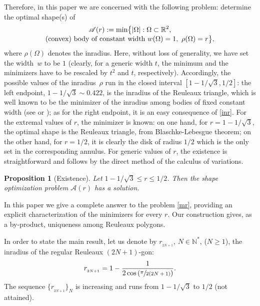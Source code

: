 \documentclass[11pt]{article}
\numberwithin{equation}{section}
\let\mathcal\mathscr
\let\sep :
\theoremstyle{plain}
\newtheorem{proposition}[theorem]{Proposition}
\theoremstyle{definition}
\newcommand\A{\mathcal A}
\renewcommand\r{r_{_{2N+1}}}
\begin{document}
Therefore, in this paper we are concerned with the following problem: determine the optimal shape(s) of\vspace*{-3pt}
\begin{multline}\label{mr}
\A(r):=\min \bigl\{|\Omega|\sep \Omega \subset \mathbb R^2,\\[-3pt] \hbox{(convex) body of constant width $w(\Omega)=1$},\ \rho(\Omega)=r\bigr\},
\end{multline}
where $\rho(\Omega)$ denotes the inradius. Here, without loss of generality, we have set the width~$w$ to be $1$ (clearly, for a generic width $t$, the minimum and the minimizers have to be rescaled by $t^2$ and $t$, respectively). Accordingly, the possible values of the inradius~$\rho$ run in the closed interval $[1-1/\sqrt{3}, 1/2]$:
{the left endpoint, $1-1/\sqrt{3} \sim 0.422$, is the inradius of the Reuleaux triangle, which is well known to be the minimizer of the inradius among bodies of fixed constant width (see \cite{BF}
or \cite{CG}); as for the right endpoint, it is an easy consequence of \eqref{inr}.}
For the extremal values of $r$, the minimizer is known: on one hand, for $r=1-1/\sqrt{3}$, the optimal shape is the Reuleaux triangle, from Blaschke-Lebesgue theorem; on the other hand, for $r=1/2$, it is clearly the disk of radius $1/2$ which is the only set in the corresponding annulus.
For generic values of $r$, the existence is straightforward and follows by the direct method of the calculus of variations.

\begin{proposition}[Existence]\label{prop1}
Let $1-1/\sqrt{3}\leq r \leq 1/2$. Then the shape optimization problem $\A(r)$ has a solution.
\end{proposition}

In this paper we give a complete answer to the problem \eqref{mr}, providing an explicit characterization of the minimizers for every $r$.
Our construction gives, as a by-product, uniqueness {among Reuleaux polygons}.

In order to state the main result, let us denote by $\r$, $N\in \mathbb N^*$, {($N\geq 1$)}, the inradius of the regular Reuleaux $(2N+1)$-gon:
\[
\r=1-\frac{1}{2\cos\left(\sfrac{\pi}{2(2N+1)}\right)}.
\]
The sequence $\{\r\}_N$ is increasing and runs from $1-1/\sqrt{3}$ to $1/2$ (not attained).
\end{document}
